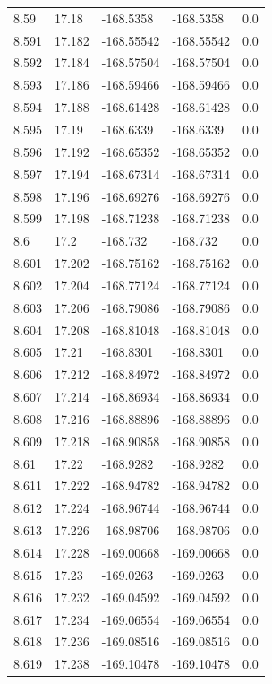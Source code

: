 \begin{tabular}{lllll}
8.59 & 17.18 & -168.5358 & -168.5358 & 0.0 \\
8.591 & 17.182 & -168.55542 & -168.55542 & 0.0 \\
8.592 & 17.184 & -168.57504 & -168.57504 & 0.0 \\
8.593 & 17.186 & -168.59466 & -168.59466 & 0.0 \\
8.594 & 17.188 & -168.61428 & -168.61428 & 0.0 \\
8.595 & 17.19 & -168.6339 & -168.6339 & 0.0 \\
8.596 & 17.192 & -168.65352 & -168.65352 & 0.0 \\
8.597 & 17.194 & -168.67314 & -168.67314 & 0.0 \\
8.598 & 17.196 & -168.69276 & -168.69276 & 0.0 \\
8.599 & 17.198 & -168.71238 & -168.71238 & 0.0 \\
8.6 & 17.2 & -168.732 & -168.732 & 0.0 \\
8.601 & 17.202 & -168.75162 & -168.75162 & 0.0 \\
8.602 & 17.204 & -168.77124 & -168.77124 & 0.0 \\
8.603 & 17.206 & -168.79086 & -168.79086 & 0.0 \\
8.604 & 17.208 & -168.81048 & -168.81048 & 0.0 \\
8.605 & 17.21 & -168.8301 & -168.8301 & 0.0 \\
8.606 & 17.212 & -168.84972 & -168.84972 & 0.0 \\
8.607 & 17.214 & -168.86934 & -168.86934 & 0.0 \\
8.608 & 17.216 & -168.88896 & -168.88896 & 0.0 \\
8.609 & 17.218 & -168.90858 & -168.90858 & 0.0 \\
8.61 & 17.22 & -168.9282 & -168.9282 & 0.0 \\
8.611 & 17.222 & -168.94782 & -168.94782 & 0.0 \\
8.612 & 17.224 & -168.96744 & -168.96744 & 0.0 \\
8.613 & 17.226 & -168.98706 & -168.98706 & 0.0 \\
8.614 & 17.228 & -169.00668 & -169.00668 & 0.0 \\
8.615 & 17.23 & -169.0263 & -169.0263 & 0.0 \\
8.616 & 17.232 & -169.04592 & -169.04592 & 0.0 \\
8.617 & 17.234 & -169.06554 & -169.06554 & 0.0 \\
8.618 & 17.236 & -169.08516 & -169.08516 & 0.0 \\
8.619 & 17.238 & -169.10478 & -169.10478 & 0.0 \\

\end{tabular}

